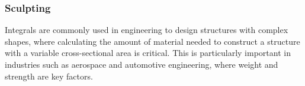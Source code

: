 \documentclass[13pt,a4paper]{report}
\begin{document}





\subsubsection{Sculpting}

Integrals are commonly used in engineering to design structures with complex shapes, where calculating the amount of material needed to construct a structure with a variable cross-sectional area is critical. This is particularly important in industries such as aerospace and automotive engineering, where weight and strength are key factors.

\vspace{0.6cm}
\end{document}
